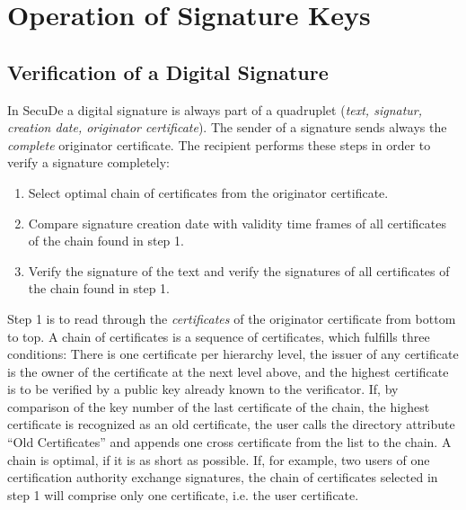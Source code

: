 \section{Operation of Signature Keys}
\thispagestyle{myheadings}
\label{ops}

\subsection{Verification of a Digital Signature}
\label{ops-vds}

In SecuDe
a digital signature is always part of a quadruplet
({\em text, signatur, creation date, originator certificate}).
The sender of a signature sends always the {\em complete}
originator certificate.
The recipient performs these steps in order to verify a signature
completely:

\begin{enumerate}
\item Select optimal chain of certificates from the originator certificate.
\item Compare signature creation date with
validity time frames of all certificates
of the chain found in step 1.
\item Verify the signature of the text and
verify the signatures of all certificates
of the chain found in step 1.
\end{enumerate}

Step 1 is to read through the {\em certificates} of the
originator certificate from bottom to top.
A chain of certificates is a sequence of certificates,
which fulfills three conditions:
There is one certificate per hierarchy level,
the issuer of any certificate is the owner of the certificate at the
next level above,
and the highest certificate is to be verified by a public key
already known to the verificator.
If, by comparison of the key number of the last certificate
of the chain, the highest certificate is recognized as an old
certificate, the user calls the directory attribute ``Old Certificates''
and appends one cross certificate from the list to the chain.
A chain is optimal, if it is as short as possible.
If, for example, two
users of one certification authority exchange signatures,
the chain of certificates selected in step 1 will comprise only one
certificate, i.e. the user certificate.


